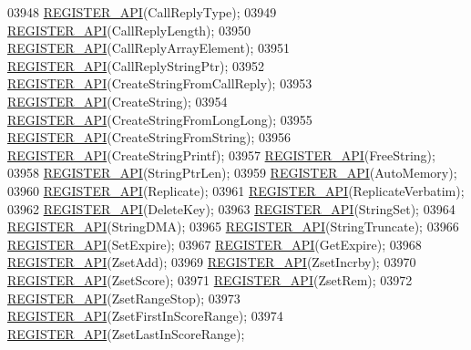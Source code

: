 \begin{DoxyCode}
{{{{{{{{{{{{{{{{{{{03948     \hyperlink{module_8c_a38783dad7766982759c7d417a8ab9211}{REGISTER\_API}(CallReplyType);
03949     \hyperlink{module_8c_a38783dad7766982759c7d417a8ab9211}{REGISTER\_API}(CallReplyLength);
03950     \hyperlink{module_8c_a38783dad7766982759c7d417a8ab9211}{REGISTER\_API}(CallReplyArrayElement);
03951     \hyperlink{module_8c_a38783dad7766982759c7d417a8ab9211}{REGISTER\_API}(CallReplyStringPtr);
03952     \hyperlink{module_8c_a38783dad7766982759c7d417a8ab9211}{REGISTER\_API}(CreateStringFromCallReply);
03953     \hyperlink{module_8c_a38783dad7766982759c7d417a8ab9211}{REGISTER\_API}(CreateString);
03954     \hyperlink{module_8c_a38783dad7766982759c7d417a8ab9211}{REGISTER\_API}(CreateStringFromLongLong);
03955     \hyperlink{module_8c_a38783dad7766982759c7d417a8ab9211}{REGISTER\_API}(CreateStringFromString);
03956     \hyperlink{module_8c_a38783dad7766982759c7d417a8ab9211}{REGISTER\_API}(CreateStringPrintf);
03957     \hyperlink{module_8c_a38783dad7766982759c7d417a8ab9211}{REGISTER\_API}(FreeString);
03958     \hyperlink{module_8c_a38783dad7766982759c7d417a8ab9211}{REGISTER\_API}(StringPtrLen);
03959     \hyperlink{module_8c_a38783dad7766982759c7d417a8ab9211}{REGISTER\_API}(AutoMemory);
03960     \hyperlink{module_8c_a38783dad7766982759c7d417a8ab9211}{REGISTER\_API}(Replicate);
03961     \hyperlink{module_8c_a38783dad7766982759c7d417a8ab9211}{REGISTER\_API}(ReplicateVerbatim);
03962     \hyperlink{module_8c_a38783dad7766982759c7d417a8ab9211}{REGISTER\_API}(DeleteKey);
03963     \hyperlink{module_8c_a38783dad7766982759c7d417a8ab9211}{REGISTER\_API}(StringSet);
03964     \hyperlink{module_8c_a38783dad7766982759c7d417a8ab9211}{REGISTER\_API}(StringDMA);
03965     \hyperlink{module_8c_a38783dad7766982759c7d417a8ab9211}{REGISTER\_API}(StringTruncate);
03966     \hyperlink{module_8c_a38783dad7766982759c7d417a8ab9211}{REGISTER\_API}(SetExpire);
03967     \hyperlink{module_8c_a38783dad7766982759c7d417a8ab9211}{REGISTER\_API}(GetExpire);
03968     \hyperlink{module_8c_a38783dad7766982759c7d417a8ab9211}{REGISTER\_API}(ZsetAdd);
03969     \hyperlink{module_8c_a38783dad7766982759c7d417a8ab9211}{REGISTER\_API}(ZsetIncrby);
03970     \hyperlink{module_8c_a38783dad7766982759c7d417a8ab9211}{REGISTER\_API}(ZsetScore);
03971     \hyperlink{module_8c_a38783dad7766982759c7d417a8ab9211}{REGISTER\_API}(ZsetRem);
03972     \hyperlink{module_8c_a38783dad7766982759c7d417a8ab9211}{REGISTER\_API}(ZsetRangeStop);
03973     \hyperlink{module_8c_a38783dad7766982759c7d417a8ab9211}{REGISTER\_API}(ZsetFirstInScoreRange);
03974     \hyperlink{module_8c_a38783dad7766982759c7d417a8ab9211}{REGISTER\_API}(ZsetLastInScoreRange);
}}}}}}}}}}}}}}}}}}}
\end{DoxyCode}
